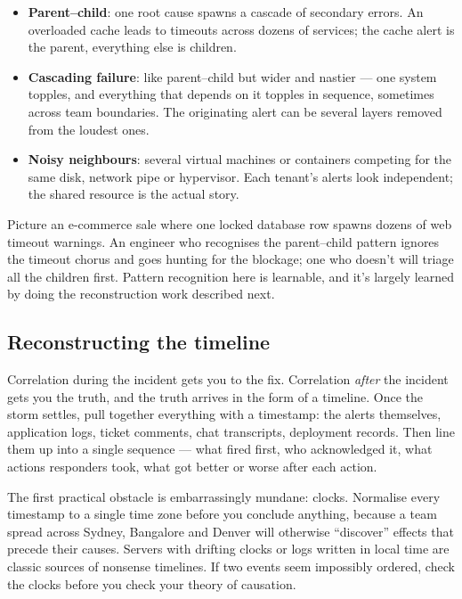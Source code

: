 \begin{itemize}[leftmargin=*]
\item \textbf{Parent–child}: one root cause spawns a cascade of secondary errors. An overloaded cache leads to timeouts across dozens of services; the cache alert is the parent, everything else is children.
\item \textbf{Cascading failure}: like parent–child but wider and nastier — one system topples, and everything that depends on it topples in sequence, sometimes across team boundaries. The originating alert can be several layers removed from the loudest ones.
\item \textbf{Noisy neighbours}: several virtual machines or containers competing for the same disk, network pipe or hypervisor. Each tenant's alerts look independent; the shared resource is the actual story.
\end{itemize}

Picture an e-commerce sale where one locked database row spawns dozens of web timeout warnings. An engineer who recognises the parent–child pattern ignores the timeout chorus and goes hunting for the blockage; one who doesn't will triage all the children first. Pattern recognition here is learnable, and it's largely learned by doing the reconstruction work described next.



\subsection{Reconstructing the timeline}


Correlation during the incident gets you to the fix. Correlation \emph{after} the incident gets you the truth, and the truth arrives in the form of a timeline. Once the storm settles, pull together everything with a timestamp: the alerts themselves, application logs, ticket comments, chat transcripts, deployment records. Then line them up into a single sequence — what fired first, who acknowledged it, what actions responders took, what got better or worse after each action.


The first practical obstacle is embarrassingly mundane: clocks. Normalise every timestamp to a single time zone before you conclude anything, because a team spread across Sydney, Bangalore and Denver will otherwise ``discover'' effects that precede their causes. Servers with drifting clocks or logs written in local time are classic sources of nonsense timelines. If two events seem impossibly ordered, check the clocks before you check your theory of causation.


